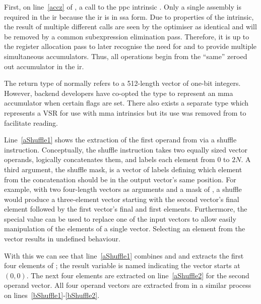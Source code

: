 \documentclass[\main/thesis.tex]{subfiles}
\begin{document}
First, on line~\ref{accz} of , a call to the \gls{ppc} \gls{intrinsic} \footnotemark.
Only a single assembly is required in the \gls{ir} because the \gls{ir} is in \gls{ssa} form.
Due to properties of the intrinsic, the result of multiple different calls are seen by the optimiser as identical and will be removed by a common subexpression elimination pass.
Therefore, it is up to the register allocation pass to later recognise the need for and to provide multiple simultaneous accumulators.
Thus, all operations begin from the ``same'' zeroed out accumulator in the \gls{ir}.

The  return type of  normally refers to a 512-length vector of one-bit integers.
However, backend developers have co-opted the type to represent an \gls{mma} accumulator when certain flags are set.
There also exists a separate type which represents a VSR for use with \gls{mma} \glspl{intrinsic} but its use was removed from  to facilitate reading\footnotemark.

Line~\ref{aShuffle1} shows the extraction of the first operand from  via a shuffle instruction.
Conceptually, the shuffle instruction takes two equally sized vector operands, logically concatenates them, and labels each element from $0$ to $2N$.
A third argument, the shuffle mask, is a vector of labels defining which element from the concatenation should be in the output vector's same position.
For example, with two four-length vectors as arguments and a mask of , a shuffle would produce a three-element vector starting with the second vector's final element followed by the first vector's final and first elements.
Furthermore, the special value  can be used to replace one of the input vectors to allow easily manipulation of the elements of a single vector.
Selecting an element from the  vector results in undefined behaviour.

With this we can see that line~\ref{aShuffle1} combines  and  and extracts the first four elements of ; the result variable is named  indicating the vector starts at $(0, 0)$.
The next four elements are extracted on line~\ref{aShuffle2} for the second operand vector.
All four operand vectors are extracted from  in a similar process on lines~\ref{bShuffle1}-\ref{bShuffle2}.
\end{document}
